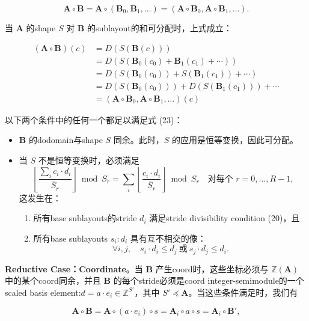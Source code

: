 \documentclass{article}
\begin{document}
\[
\mathbf{A} \circ \mathbf{B} = \mathbf{A} \circ (\mathbf{B}_0, \mathbf{B}_1, \ldots) = (\mathbf{A} \circ \mathbf{B}_0, \mathbf{A} \circ \mathbf{B}_1, \ldots).  \tag{22}
\]

当 \(\mathbf{A}\) 的shape \(S\) 对 \(\mathbf{B}\) 的sublayout的和可分配时，上式成立：

\[
\begin{aligned}
(\mathbf{A} \circ \mathbf{B})(c) &= D(S(\mathbf{B}(c))) \\
&= D(S(\mathbf{B}_0(c_0) + \mathbf{B}_1(c_1) + \cdots)) \\
&= D(S(\mathbf{B}_0(c_0)) + S(\mathbf{B}_1(c_1)) + \cdots) \\
&= D(S(\mathbf{B}_0(c_0))) + D(S(\mathbf{B}_1(c_1))) + \cdots \\
&= (\mathbf{A} \circ \mathbf{B}_0, \mathbf{A} \circ \mathbf{B}_1, \ldots)(c)
\end{aligned}  \tag{23}
\]

以下两个条件中的任何一个都足以满足式 (23)：

\begin{itemize}
\item \(\mathbf{B}\) 的dodomain与shape \(S\) 同余。此时，\(S\) 的应用是恒等变换，因此可分配。
\item 当 \(S\) 不是恒等变换时，必须满足
\[
\left\lfloor \frac{\sum_i c_i \cdot d_i}{\overline{S}_r} \right\rfloor \bmod S_r = \sum_i \left\lfloor \frac{c_i \cdot d_i}{\overline{S}_r} \right\rfloor \bmod S_r \quad \text{对每个 } r = 0, \ldots, R-1,
\]
这发生在：
\begin{enumerate}
\item 所有base sublayouts的stride \(d_i\) 满足stride divisibility condition (20)，且
\item 所有base sublayouts \(s_i : d_i\) 具有互不相交的像：
\[
\forall i, j,\quad s_i \cdot d_i \le d_j \ \text{或}\ s_j \cdot d_j \le d_i .
\]
\end{enumerate}
\end{itemize}

\textbf{Reductive Case：Coordinate}。当 \(\mathbf{B}\) 产生coord时，这些坐标必须与 \(\mathbb{Z}(\mathbf{A})\) 中的某个coord同余，并且 \(\mathbf{B}\) 的每个stride必须是coord integer-semimodule的一个scaled basis element:\(d = a \cdot e_i \in \mathbb{Z}^{S'}\)，其中 \(S' \preceq \mathbf{A}\)。当这些条件满足时，我们有

\[
\mathbf{A} \circ \mathbf{B} = \mathbf{A} \circ (a \cdot e_i) \circ s = \mathbf{A}_i \circ a \circ s = \mathbf{A}_i \circ \mathbf{B}',
\]
\end{document}
